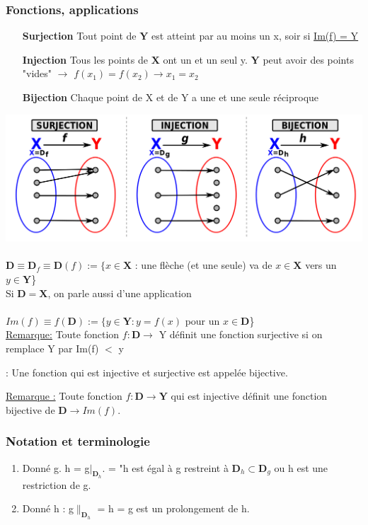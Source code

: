 \documentclass[12pt,a4paper]{article}
\begin{document}
\subsubsection{Fonctions, applications}
\begin{itemize}
\item[\textbf{Surjection}] Tout point de $\mathbf{Y}$ est atteint par au moins un x, soir si \underline{Im(f) = Y}
\item[\textbf{Injection}] Tous les points de $\mathbf{X}$ ont un et un seul y. $\mathbf{Y}$ peut avoir des points "vides" $\to$ \underline{$f(x_1) = f(x_2) \to x_1 = x_2$}
\item[\textbf{Bijection}] Chaque point de X et de Y a une et une seule réciproque
\end{itemize}
\includegraphics[scale=0.35]{illustrations_Analyse/fonctions}\\
\\
$\mathbf{D} \equiv \mathbf{D}_f \equiv \mathbf{D}(f) := \{x \in \mathbf{X}$ : une flèche (et une seule) va de $x \in \mathbf{X}$ vers un $y \in \mathbf{Y}$\}\\
Si $\mathbf{D} = \mathbf{X}$, on parle aussi d'une application\\
\\
 $Im(f) \equiv f(\mathbf{D}) := \{y \in \mathbf{Y} : y = f(x)$ pour un $x \in \mathbf{D}$\}\\
\underline{Remarque:} Toute fonction $f: \mathbf{D} \to $ Y définit une fonction surjective si on remplace Y par Im(f) $<$ y
\begin{boite}\Definition : Une fonction qui est injective et surjective est appelée bijective.
\end{boite}
\underline{Remarque :} Toute fonction $f : \mathbf{D} \to \mathbf{Y}$ qui est injective définit une fonction bijective de $\mathbf{D} \to Im(f)$.

\subsubsection{Notation et terminologie}
\begin{enumerate}%
\item Donné g. h = g$|_{\mathbf{D}_h}$. = "h est égal à g restreint à $\mathbf{D}_h \subset \mathbf{D}_g$ ou h est une restriction de g.
\item Donné h : g$\|_{\mathbf{D}_h}$ = h = g est un prolongement de h.
\end{enumerate}
\end{document}

